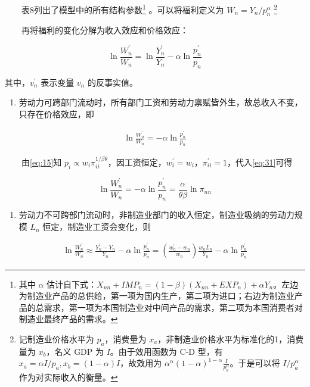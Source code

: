 \documentclass[]{article}
\providecommand{\tightlist}{%
  \setlength{\itemsep}{0pt}\setlength{\parskip}{0pt}}
\let\rmarkdownfootnote\footnote%
\def\footnote{\protect\rmarkdownfootnote}
\begin{document}
　　表8列出了模型中的所有结构参数\footnote{其中 \(\alpha\) 估计自下式：\(X_{n n}+I M P_{n}=(1-\beta)\left(X_{n n}+E X P_{n}\right)+\alpha Y_{n}\)。左边为制造业产品的总供给，第一项为国内生产，第二项为进口；右边为制造业产品的总需求，第一项为本国制造业对中间产品的需求，第二项为本国消费者对制造业最终产品的需求。} 。可以将福利定义为 \(W_n = Y_n/{p_n^\alpha}\) \footnote{记制造业价格水平为 \(p_a\)，消费量为 \(x_a\)，非制造业价格水平为标准化的1，消费量为 \(x_b\)，名义 GDP 为 \(I\)。由于效用函数为 C-D 型，有 \(x_a = \alpha I/p_a, x_b = (1-\alpha)I\)，故效用为 \(\alpha^{\alpha}(1-\alpha)^{1-\alpha} \frac{I}{p_a^{\alpha}}\)。于是可以将 \(I/{p_a^\alpha}\) 作为对实际收入的衡量。}

　　再将福利的变化分解为收入效应和价格效应：

\[
\ln \frac{W_{n}^{\prime}}{W_{n}}=\ln \frac{Y_{n}^{\prime}}{Y_{n}}-\alpha \ln \frac{p_{n}^{\prime}}{p_{n}} 
\]

其中，\(v_n^{\prime}\) 表示变量 \(v_n\) 的反事实值。

\begin{enumerate}
\def\labelenumi{\arabic{enumi}.}
\tightlist
\item
  劳动力可跨部门流动时，所有部门工资和劳动力禀赋皆外生，故总收入不变，只存在价格效应，即
\end{enumerate}

\begin{align}
\ln \frac{W_{n}^{\prime}}{W_{n}}=-\alpha \ln \frac{p_{n}^{\prime}}{p_{n}} \label{eq:31}
\end{align}

　　由\eqref{eq:15}知 \(p_i \propto w_i \pi_{ii}^{1/{\beta \theta}}\)，因工资恒定，\(w_i^{\prime} = w_i\)，\(\pi_{ii}^{\prime}=1\)，代入\eqref{eq:31}可得

\[
\ln \frac{W_{n}^{\prime}}{W_{n}}=-\alpha \ln \frac{p_{n}^{\prime}}{p_{n}} =\frac{\alpha}{\theta \beta} \ln \pi_{nn}
\]

\begin{enumerate}
\def\labelenumi{\arabic{enumi}.}
\setcounter{enumi}{1}
\tightlist
\item
  劳动力不可跨部门流动时，非制造业部门的收入恒定，制造业吸纳的劳动力规模 \(L_n\) 恒定，制造业工资会变化，则
\end{enumerate}

\begin{align}
\ln \frac{W_{n}^{\prime}}{W_{n}} \approx \frac{Y_{n}^{\prime}-Y_{n}}{Y_{n}}-\alpha \ln \frac{p_{n}^{\prime}}{p_{n}} =\left(\frac{w_{n}^{\prime}-w_{n}}{w_{n}}\right) \frac{w_{n} L_{n}}{Y_{n}}-\alpha \ln \frac{p_{n}^{\prime}}{p_{n}} \label{eq:32}
\end{align}
\end{document}
